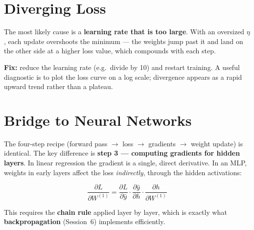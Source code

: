 \documentclass[11pt, a4paper]{article}
\begin{document}
\section{Diverging Loss}

\begin{tcolorbox}[solutionbox]
The most likely cause is a \textbf{learning rate that is too large}. With an
oversized $\eta$, each update overshoots the minimum — the weights jump past it
and land on the other side at a higher loss value, which compounds with each step.

\textbf{Fix:} reduce the learning rate (e.g.\ divide by 10) and restart training.
A useful diagnostic is to plot the loss curve on a log scale; divergence appears
as a rapid upward trend rather than a plateau.
\end{tcolorbox}

\section{Bridge to Neural Networks}

\begin{tcolorbox}[solutionbox]
The four-step recipe (forward pass $\to$ loss $\to$ gradients $\to$ weight update)
is identical. The key difference is \textbf{step 3 — computing gradients for hidden
layers}. In linear regression the gradient is a single, direct derivative. In an
MLP, weights in early layers affect the loss \emph{indirectly}, through the hidden
activations:

$$\frac{\partial L}{\partial W^{(1)}} = \frac{\partial L}{\partial \hat{y}} \cdot \frac{\partial \hat{y}}{\partial h} \cdot \frac{\partial h}{\partial W^{(1)}}$$

This requires the \textbf{chain rule} applied layer by layer, which is exactly what
\textbf{backpropagation} (Session~6) implements efficiently.
\end{tcolorbox}
\end{document}
